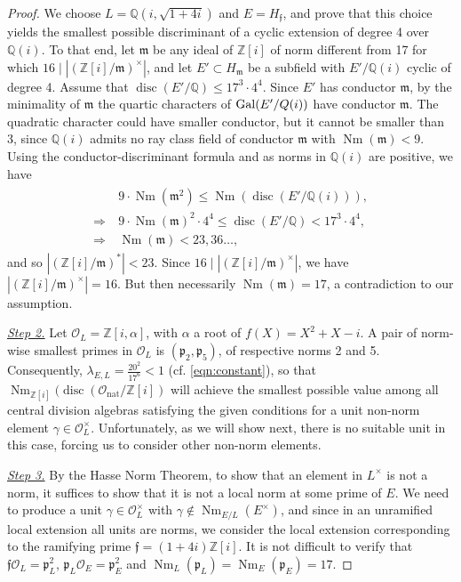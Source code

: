 \documentclass[smallextended]{svjour3}
\newcommand{\Q}{\mathbb{Q}}
\newcommand{\Z}{\mathbb{Z}}
\newcommand{\G}{{\rm Gal}}
\newcommand{\Or}{\mathcal{O}}
\DeclareMathOperator{\Nm}{Nm}
\DeclareMathOperator{\nat}{nat}
\DeclareMathOperator{\disc}{disc}
\begin{document}
\begin{proof}
We choose $L = \Q(i, \sqrt{1+4i})$ and $E = H_{\mathfrak f}$, and prove that this choice yields the smallest possible discriminant of a cyclic extension of degree 4 over $\Q(i)$. To that end, let $\mathfrak m$ be any ideal of $\Z[i]$ of norm different from 17 for which $16 \mid \left |(\Z[i]/\mathfrak m)^\times\right |$, and let $E' \subset H_{\mathfrak m}$ be a subfield with $E'/\Q(i)$ cyclic of degree 4. Assume that $\disc(E'/\Q)\le 17^3 \cdot 4^4$. Since $E'$ has conductor $\mathfrak m$, by the minimality of $\mathfrak m$  the quartic characters of $\G(E'/Q(i))$ have conductor $\mathfrak m$. 
The quadratic character could have smaller conductor, but it cannot be smaller than 3, since $\Q(i)$ admits no ray class field of conductor $\mathfrak m$ with $\Nm(\mathfrak m) < 9$. 
Using the conductor-discriminant formula and as norms in $\Q(i)$ are positive, we have
\begin{align}
\label{condisc}
\begin{split}
	&9 \cdot \Nm(\mathfrak m^2) \le \Nm(\disc(E'/\Q(i))), \\
	\Rightarrow\ &9 \cdot \Nm(\mathfrak m)^2\cdot4^4 \le \disc(E'/\Q)< 17^3 \cdot 4^4, \\
	\Rightarrow\ &\Nm(\mathfrak m) < 23,36\ldots,
\end{split}
\end{align}
and so $\left |(\Z[i]/\mathfrak m)^*\right |<23.$ Since $16 \mid \left|(\Z[i]/\mathfrak m)^\times\right|$, we have $\left|(\Z[i]/\mathfrak m)^\times\right| = 16$. But then necessarily $\Nm(\mathfrak m) = 17$, a contradiction to our assumption.

\medskip

\noindent\emph{\underline{Step 2.}}   
Let $\Or_L = \Z[i,\alpha]$, with $\alpha$ a root of $f(X)=X^2+X-i$. A pair of norm-wise smallest primes in $\Or_L$ is $(\mathfrak p_2, \mathfrak p_5)$, of respective norms 2 and 5. Consequently, $\lambda_{E,L} = \frac{20^2}{17^6} < 1$ (cf. \eqref{eqn:constant}), so that $\Nm_{\Z[i]}(\disc(\Or_{\nat}/\Z[i])$ will achieve the smallest possible value among all central division algebras satisfying the given conditions for a unit non-norm element $\gamma \in \Or_L^{\times}$.  Unfortunately, as we will show next, there is no suitable unit in this case, forcing us to consider other non-norm elements.

\medskip
\noindent\emph{\underline{Step 3.}}  
By the Hasse Norm Theorem, to show that an element in $L^{\times}$ is not a norm, it suffices to show that it is not a local norm at some prime of $E$. We need to produce a unit $\gamma \in \Or_L^\times$ with  $\gamma \notin \Nm_{E/L}(E^{\times})$, and since in an unramified local extension all units are norms, we consider the local extension corresponding to the ramifying prime $\mathfrak f = (1+4i)\Z[i]$. It is not difficult to verify that $\mathfrak f\Or_L=\mathfrak p_{L}^2$, $\mathfrak p_{L}\Or_E=\mathfrak p_{E}^2$ and  $\Nm_{L}(\mathfrak p_{L})=\Nm_{E}(\mathfrak p_{E})={17}$.  


\end{proof}
\end{document}
